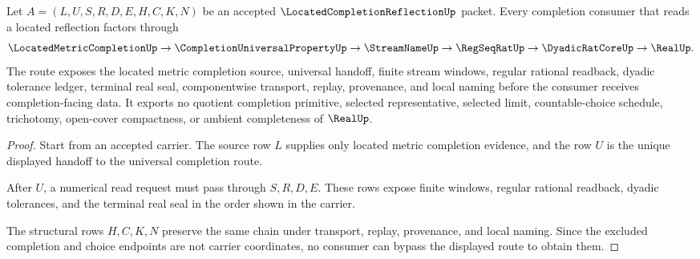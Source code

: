 \begin{theorem}
\label{thm:located-completion-reflection-universal-route}
Let $A=(L,U,S,R,D,E,H,C,K,N)$ be an accepted $\LocatedCompletionReflectionUp$ packet. Every completion consumer that reads a located reflection factors through
$$
\LocatedMetricCompletionUp\to\CompletionUniversalPropertyUp\to\StreamNameUp\to\RegSeqRatUp\to\DyadicRatCoreUp\to\RealUp .
$$
The route exposes the located metric completion source, universal handoff, finite stream windows, regular rational readback, dyadic tolerance ledger, terminal real seal, componentwise transport, replay, provenance, and local naming before the consumer receives completion-facing data. It exports no quotient completion primitive, selected representative, selected limit, countable-choice schedule, trichotomy, open-cover compactness, or ambient completeness of $\RealUp$.
\end{theorem}
\begin{proof}
Start from an accepted carrier. The source row $L$ supplies only located metric completion evidence, and the row $U$ is the unique displayed handoff to the universal completion route.

After $U$, a numerical read request must pass through $S,R,D,E$. These rows expose finite windows, regular rational readback, dyadic tolerances, and the terminal real seal in the order shown in the carrier.

The structural rows $H,C,K,N$ preserve the same chain under transport, replay, provenance, and local naming. Since the excluded completion and choice endpoints are not carrier coordinates, no consumer can bypass the displayed route to obtain them.
\end{proof}


\begin{closurestatus}{\LocatedCompletionReflectionUp}
  \theoryclosure{\seedClosure}
  \formalstatus{\unformalizedV}
\end{closurestatus}
